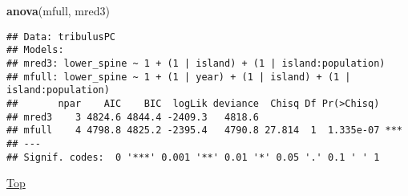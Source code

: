 \documentclass[
]{article}
\newenvironment{Shaded}{\begin{snugshade}}{\end{snugshade}}
\newcommand{\KeywordTok}[1]{\textcolor[rgb]{0.13,0.29,0.53}{\textbf{#1}}}
\newcommand{\NormalTok}[1]{#1}
\begin{document}
\begin{Shaded}
\begin{Highlighting}[]
\KeywordTok{anova}\NormalTok{(mfull, mred3)}
\end{Highlighting}
\end{Shaded}

\begin{verbatim}
## Data: tribulusPC
## Models:
## mred3: lower_spine ~ 1 + (1 | island) + (1 | island:population)
## mfull: lower_spine ~ 1 + (1 | year) + (1 | island) + (1 | island:population)
##       npar    AIC    BIC  logLik deviance  Chisq Df Pr(>Chisq)    
## mred3    3 4824.6 4844.4 -2409.3   4818.6                         
## mfull    4 4798.8 4825.2 -2395.4   4790.8 27.814  1  1.335e-07 ***
## ---
## Signif. codes:  0 '***' 0.001 '**' 0.01 '*' 0.05 '.' 0.1 ' ' 1
\end{verbatim}

\protect\hyperlink{generalized-linear-model}{Top}
\end{document}
